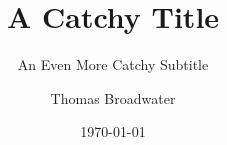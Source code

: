 
\title{A Catchy Title}
\subtitle{An Even More Catchy Subtitle}
\author{Thomas Broadwater}
\date{\today}